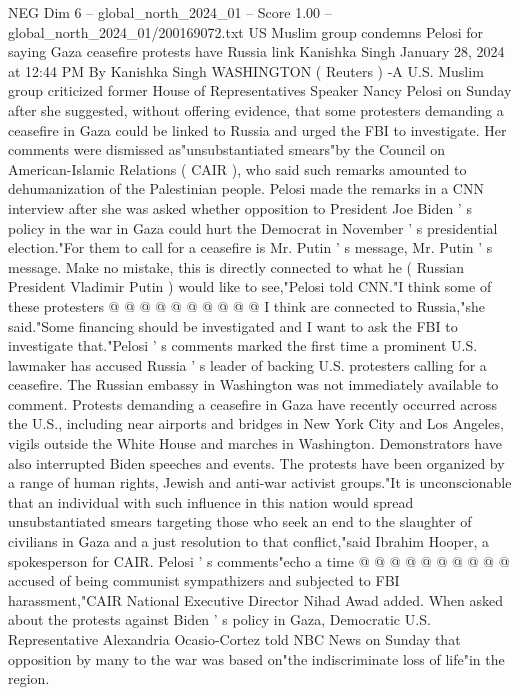 \begin{textsample}{NEG Dim 6 – global\_north\_2024\_01 – Score 1.00 – global\_north\_2024\_01/200169072.txt}  \label{ex:f6_neg_333}
US Muslim group condemns Pelosi for saying Gaza ceasefire protests have Russia link Kanishka Singh January 28, 2024 at 12:44 PM By Kanishka Singh WASHINGTON ( Reuters ) -A U.S.
Muslim group criticized former House of Representatives Speaker Nancy Pelosi on Sunday after she suggested, without offering evidence, that some protesters demanding a ceasefire in Gaza could be linked to Russia and urged the FBI to investigate.
Her comments were dismissed as"unsubstantiated smears"by the Council on American-Islamic Relations ( CAIR ), who said such remarks amounted to dehumanization of the Palestinian people.
Pelosi made the remarks in a CNN interview after she was asked whether opposition to President Joe Biden ' s policy in the war in Gaza could hurt the Democrat in November ' s presidential election."For them to call for a ceasefire is Mr.
Putin ' s message, Mr.
Putin ' s message.
Make no mistake, this is directly connected to what he ( Russian President Vladimir Putin ) would like to see,"Pelosi told CNN."I think some of these protesters @ @ @ @ @ @ @ @ @ @ I think are connected to Russia,"she said."Some financing should be investigated and I want to ask the FBI to investigate that."Pelosi ' s comments marked the first time a prominent U.S. lawmaker has accused Russia ' s leader of backing U.S. protesters calling for a ceasefire.
The Russian embassy in Washington was not immediately available to comment.
Protests demanding a ceasefire in Gaza have recently occurred across the U.S., including near airports and bridges in New York City and Los Angeles, vigils outside the White House and marches in Washington.
Demonstrators have also interrupted Biden speeches and events.
The protests have been organized by a range of human rights, Jewish and anti-war activist groups."It is unconscionable that an individual with such influence in this nation would spread unsubstantiated smears targeting those who seek an end to the slaughter of civilians in Gaza and a just resolution to that conflict,"said Ibrahim Hooper, a spokesperson for CAIR.
Pelosi ' s comments"echo a time @ @ @ @ @ @ @ @ @ @ accused of being communist sympathizers and subjected to FBI harassment,"CAIR National Executive Director Nihad Awad added.
When asked about the protests against Biden ' s policy in Gaza, Democratic U.S.
Representative Alexandria Ocasio-Cortez told NBC News on Sunday that opposition by many to the war was based on"the indiscriminate loss of life"in the region.

\end{textsample}
